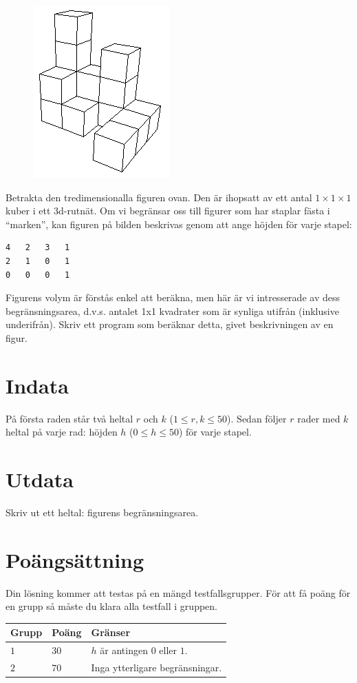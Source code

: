 
\begin{figure}
\centering
\includegraphics{area}
\end{figure}

Betrakta den tredimensionalla figuren ovan. Den är ihopsatt av ett antal $1 \times 1 \times 1$ kuber i ett 3d-rutnät. Om vi begränsar oss till figurer som har staplar fästa i ``marken'', kan figuren på bilden beskrivas genom att ange höjden för varje stapel: 

\begin{verbatim}
4	2	3	1
2	1	0	1
0	0	0	1
\end{verbatim}

Figurens volym är förstås enkel att beräkna, men här är vi intresserade av dess begränsningsarea, d.v.s. antalet 1x1 kvadrater som är synliga utifrån (inklusive underifrån). Skriv ett program som beräknar detta, givet beskrivningen av en figur. 

\section*{Indata}
På första raden står två heltal $r$ och $k$ ($1 \le r, k \le 50$). Sedan följer $r$ rader med $k$ heltal på varje rad:
höjden $h$ ($0 \leq h \leq 50$) för varje stapel.

\section*{Utdata}
Skriv ut ett heltal: figurens begränsningsarea.

\section*{Poängsättning}
Din lösning kommer att testas på en mängd testfallsgrupper.
För att få poäng för en grupp så måste du klara alla testfall i gruppen.


\noindent
\begin{tabular}{| l | l | p{12cm} |}
  \hline
  \textbf{Grupp} & \textbf{Poäng} & \textbf{Gränser} \\ \hline
  $1$    & $30$       & $h$ är antingen $0$ eller $1$. \\ \hline
  $2$    & $70$       & Inga ytterligare begränsningar. \\ \hline
\end{tabular}
